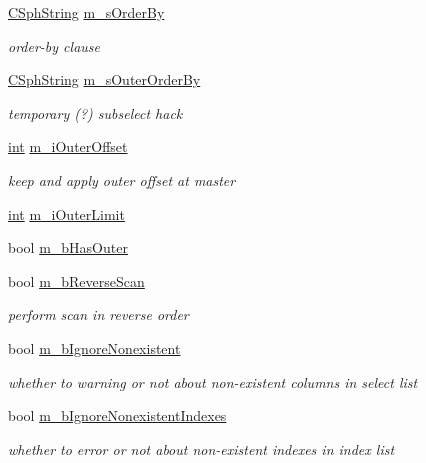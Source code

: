 \begin{DoxyCompactItemize}
\hyperlink{structCSphString}{C\-Sph\-String} \hyperlink{classCSphQuery_a91973e6042966eea08b88b56a8950da5}{m\-\_\-s\-Order\-By}
\begin{DoxyCompactList}\small\item\em order-\/by clause \end{DoxyCompactList}\item 
\hyperlink{structCSphString}{C\-Sph\-String} \hyperlink{classCSphQuery_a964070184c2d3aff30550fe2d7da73dd}{m\-\_\-s\-Outer\-Order\-By}
\begin{DoxyCompactList}\small\item\em temporary (?) subselect hack \end{DoxyCompactList}\item 
\hyperlink{sphinxexpr_8cpp_a4a26e8f9cb8b736e0c4cbf4d16de985e}{int} \hyperlink{classCSphQuery_a92854a548ba9feba57791dec1f64c80b}{m\-\_\-i\-Outer\-Offset}
\begin{DoxyCompactList}\small\item\em keep and apply outer offset at master \end{DoxyCompactList}\item 
\hyperlink{sphinxexpr_8cpp_a4a26e8f9cb8b736e0c4cbf4d16de985e}{int} \hyperlink{classCSphQuery_a144ed2a1aa4ff60fb8f1d3f2a8f42741}{m\-\_\-i\-Outer\-Limit}
\item 
bool \hyperlink{classCSphQuery_ab18a4f8710e145740e274d94a77a8764}{m\-\_\-b\-Has\-Outer}
\item 
bool \hyperlink{classCSphQuery_a7412f89477542f7f5b87d1f16a7f068c}{m\-\_\-b\-Reverse\-Scan}
\begin{DoxyCompactList}\small\item\em perform scan in reverse order \end{DoxyCompactList}\item 
bool \hyperlink{classCSphQuery_ae41f8c8748a013d131f2c24ce7424adb}{m\-\_\-b\-Ignore\-Nonexistent}
\begin{DoxyCompactList}\small\item\em whether to warning or not about non-\/existent columns in select list \end{DoxyCompactList}\item 
bool \hyperlink{classCSphQuery_afd12259370b1d3c693fcba4de46eb2f3}{m\-\_\-b\-Ignore\-Nonexistent\-Indexes}
\begin{DoxyCompactList}\small\item\em whether to error or not about non-\/existent indexes in index list \end{DoxyCompactList}\item 

\end{DoxyCompactItemize}
